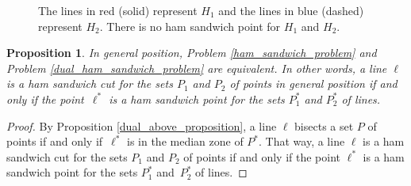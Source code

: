\documentclass{article}
\newtheorem{proposition}{Proposition}
\begin{document}
  \begin{figure}[htbp]%
    \centering
    \qquad
    \qquad
    \caption{The lines in red (solid) represent $H_1$ and the lines in blue (dashed) represent $H_2$. There is no ham sandwich point for $H_1$ and $H_2$. }%
    \label{no_answer_example}%
\end{figure}

\begin{proposition}\label{problem_equivalence_proposition}
  In general position, Problem \ref{ham_sandwich_problem} and Problem \ref{dual_ham_sandwich_problem} are equivalent. 
  In other words, a line $\ell$ is a ham sandwich cut for the sets $P_1$ and $P_2$ of points in general position 
  if and only if the point~$\ell^*$ is a ham sandwich point for the sets $P_1^*$ and $P_2^*$ of lines.
\end{proposition}
\begin{proof}
  By Proposition \ref{dual_above_proposition}, a line $\ell$ bisects a set $P$ of points if and only if~$\ell^*$ is in the median zone of $P^*$.
  That way, a line $\ell$ is a ham sandwich cut for the sets $P_1$ and $P_2$ of points if and only if the point $\ell^*$ is a ham sandwich point for the sets $P_1^*$ and~$P_2^*$ of lines.
\end{proof}
\end{document}
